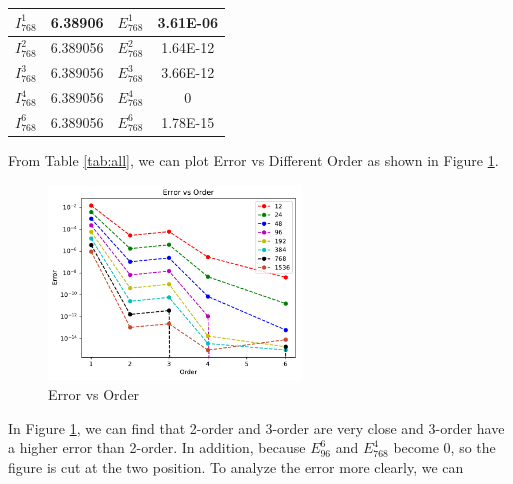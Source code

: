\documentclass{article}
\begin{document}
\begin{table}[H]
{\begin{tabular}{|c|c|c|c|}
            \hline
            $I_{768}^1$ & 6.38906 & $E_{768}^1$ & 3.61E-06 \\ \hline
            $I_{768}^2$ & 6.389056 & $E_{768}^2$ & 1.64E-12 \\ \hline
            $I_{768}^3$ & 6.389056 & $E_{768}^3$ & 3.66E-12 \\ \hline
            $I_{768}^4$ & 6.389056 & $E_{768}^4$ & 0 \\ \hline
            $I_{768}^6$ & 6.389056 & $E_{768}^6$ & 1.78E-15 \\ \hline
        \end{tabular}
        \label{tab:768}
    }
\end{table}
From Table \ref{tab:all}, we can plot Error vs Different Order as shown in Figure \ref{fig:error_order}.
\begin{figure}[H]
    \centering
    \includegraphics[width=0.6\textwidth]{src/error.pdf}
    \caption{Error vs Order}
    \label{fig:error_order}
\end{figure}
In Figure \ref{fig:error_order}, we can find that 2-order and 3-order are very close and 3-order have a higher error than 2-order. In addition, 
because $E_{96}^6$ and $E_{768}^4$ become 0, so the figure is cut at the two position. To analyze the error more clearly, we can 
\end{document}
